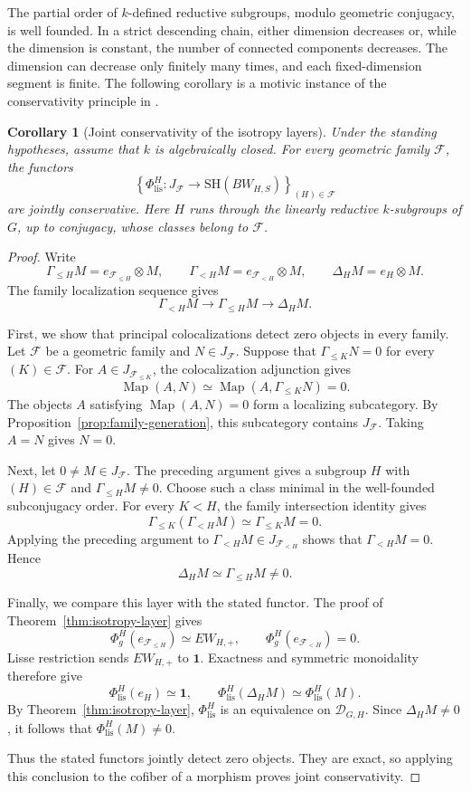 \documentclass[11pt,reqno]{amsart}
\newtheorem{corollary}[theorem]{Corollary}
\theoremstyle{definition}
\theoremstyle{remark}
\theoremstyle{plain}
\numberwithin{equation}{section}
\newcommand{\SH}{\mathrm{SH}}
\newcommand{\one}{\mathbf 1}
\newcommand{\lis}{\mathrm{lis}}
\DeclareMathOperator{\Map}{Map}
\newcommand{\D}{\mathcal D}
\newcommand{\F}{\mathcal F}
\begin{document}
The partial order of \(k\)-defined reductive subgroups, modulo
geometric conjugacy, is well founded.
In a strict descending chain, either dimension decreases or,
while the dimension is constant, the number of connected
components decreases.
The dimension can decrease only finitely many times, and
each fixed-dimension segment is finite.
The following corollary is a motivic
instance of the conservativity principle in
\cite[Remark~1.3.10]{AMGR}.

\begin{corollary}[Joint conservativity of the isotropy layers]
\label{cor:isotropy-joint-conservativity}
Under the standing hypotheses, assume that \(k\) is
algebraically closed.
For every geometric family \(\F\), the functors
\[
 \left\{
 \Phi_{\lis}^H:J_\F\longrightarrow\SH(BW_{H,S})
 \right\}_{(H)\in\F}
\]
are jointly conservative.
Here \(H\) runs through the linearly reductive
\(k\)-subgroups of \(G\), up to conjugacy, whose classes
belong to \(\F\).
\end{corollary}

\begin{proof}
Write
\[
 \Gamma_{\leq H}M=e_{\F_{\leq H}}\otimes M,
 \qquad
 \Gamma_{<H}M=e_{\F_{<H}}\otimes M,
 \qquad
 \Delta_HM=e_H\otimes M.
\]
The family localization sequence gives
\[
 \Gamma_{<H}M\longrightarrow
 \Gamma_{\leq H}M\longrightarrow\Delta_HM.
\]

First, we show that principal colocalizations detect zero
objects in every family.
Let \(\mathcal F\) be a geometric family and
\(N\in J_{\mathcal F}\).
Suppose that \(\Gamma_{\leq K}N=0\) for every
\((K)\in\mathcal F\).
For \(A\in J_{\F_{\leq K}}\), the colocalization adjunction gives
\[
 \Map(A,N)\simeq\Map(A,\Gamma_{\leq K}N)=0.
\]
The objects \(A\) satisfying \(\Map(A,N)=0\) form a
localizing subcategory.
By Proposition~\ref{prop:family-generation}, this subcategory
contains \(J_{\mathcal F}\).
Taking \(A=N\) gives \(N=0\).

Next, let \(0\neq M\in J_\F\).
The preceding argument gives a subgroup \(H\) with
\((H)\in\F\) and \(\Gamma_{\leq H}M\neq0\).
Choose such a class minimal in the well-founded
subconjugacy order.
For every \(K<H\), the family intersection identity gives
\[
 \Gamma_{\leq K}(\Gamma_{<H}M)
 \simeq\Gamma_{\leq K}M=0.
\]
Applying the preceding argument to
\(\Gamma_{<H}M\in J_{\F_{<H}}\) shows that
\(\Gamma_{<H}M=0\).
Hence
\[
 \Delta_HM\simeq\Gamma_{\leq H}M\neq0.
\]

Finally, we compare this layer with the stated functor.
The proof of Theorem~\ref{thm:isotropy-layer} gives
\[
 \Phi_g^H(e_{\F_{\leq H}})\simeq EW_{H,+},
 \qquad
 \Phi_g^H(e_{\F_{<H}})=0.
\]
Lisse restriction sends \(EW_{H,+}\) to \(\one\).
Exactness and symmetric monoidality therefore give
\[
 \Phi_{\lis}^H(e_H)\simeq\one,
 \qquad
 \Phi_{\lis}^H(\Delta_HM)
 \simeq\Phi_{\lis}^H(M).
\]
By Theorem~\ref{thm:isotropy-layer},
\(\Phi_{\lis}^H\) is an equivalence on \(\D_{G,H}\).
Since \(\Delta_HM\neq0\), it follows that
\(\Phi_{\lis}^H(M)\neq0\).

Thus the stated functors jointly detect zero objects.
They are exact, so applying this conclusion to the cofiber
of a morphism proves joint conservativity.
\end{proof}
\end{document}
